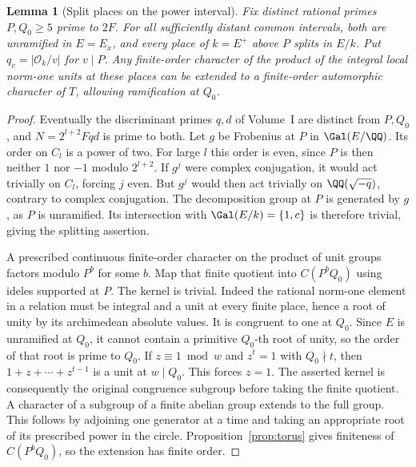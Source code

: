 \documentclass[a4paper,11pt]{article}
\newtheorem{lemma}[proposition]{Lemma}
\theoremstyle{definition}
\theoremstyle{remark}
\numberwithin{equation}{section}
\newcommand{\OO}{\mathcal O}
\begin{document}
\begin{lemma}[Split places on the power interval]\label{lem:split29}
Fix distinct rational primes \(P,Q_0\ge5\) prime to \(2F\). For all sufficiently distant common intervals, both are unramified in \(E=E_x\), and every place of \(k=E^+\) above \(P\) splits in \(E/k\). Put \(q_v=|\OO_k/v|\) for \(v\mid P\). Any finite-order character of the product of the integral local norm-one units at these places can be extended to a finite-order automorphic character of \(T\), allowing ramification at \(Q_0\).
\end{lemma}
\begin{proof}
Eventually the discriminant primes \(q,d\) of Volume~I are distinct from \(P,Q_0\), and \(N=2^{l+2}Fqd\) is prime to both. Let \(g\) be Frobenius at \(P\) in \(\Gal(E/\QQ)\). Its order on \(C_l\) is a power of two. For large \(l\) this order is even, since \(P\) is then neither \(1\) nor \(-1\) modulo \(2^{l+2}\). If \(g^j\) were complex conjugation, it would act trivially on \(C_l\), forcing \(j\) even. But \(g^j\) would then act trivially on \(\QQ(\sqrt{-q})\), contrary to complex conjugation. The decomposition group at \(P\) is generated by \(g\), as \(P\) is unramified. Its intersection with \(\Gal(E/k)=\{1,c\}\) is therefore trivial, giving the splitting assertion.

A prescribed continuous finite-order character on the product of unit groups factors modulo \(P^b\) for some \(b\). Map that finite quotient into \(C(P^b Q_0)\) using ideles supported at \(P\). The kernel is trivial. Indeed the rational norm-one element in a relation must be integral and a unit at every finite place, hence a root of unity by its archimedean absolute values. It is congruent to one at \(Q_0\). Since \(E\) is unramified at \(Q_0\), it cannot contain a primitive \(Q_0\)-th root of unity, so the order of that root is prime to \(Q_0\). If \(z\equiv1\bmod w\) and \(z^t=1\) with \(Q_0\nmid t\), then \(1+z+\cdots+z^{t-1}\) is a unit at \(w\mid Q_0\). This forces \(z=1\). The asserted kernel is consequently the original congruence subgroup before taking the finite quotient. A character of a subgroup of a finite abelian group extends to the full group. This follows by adjoining one generator at a time and taking an appropriate root of its prescribed power in the circle. Proposition~\ref{prop:torus} gives finiteness of \(C(P^bQ_0)\), so the extension has finite order.
\end{proof}
\end{document}

